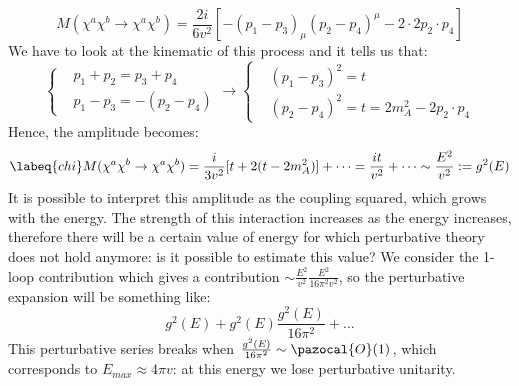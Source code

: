 \documentclass[../main.tex]{subfiles}
\begin{document}
\[
M(\chi^a\chi^b\to\chi^a\chi^b)=\frac{2i}{6v^2}[-(p_1-p_3)_\mu(p_2-p_4)^\mu-2\cdot2p_2\cdot p_4]
\]
We have to look at the kinematic of this process and it tells us that:
\[
\left\{
\begin{aligned}
&p_1+p_2=p_3+p_4\\
&p_1-p_3=-(p_2-p_4)
\end{aligned}
\right.
\to
\left\{
\begin{aligned}
&(p_1-p_3)^2=t\\
&(p_2-p_4)^2=t=2m_A^2-2p_2\cdot p_4
\end{aligned}
\right.
\]
Hence, the amplitude becomes:
\begin{equation}
\labeq{chi}
M(\chi^a\chi^b\to\chi^a\chi^b)=\frac{i}{3v^2}[t+2(t-2m_A^2)]+\dots=\frac{it}{v^2}+\dots\sim\frac{E^2}{v^2}:=g^2(E)
\end{equation}
It is possible to interpret this amplitude as the coupling squared, which grows with the energy. The strength of this interaction increases as the energy increases, therefore there will be a certain value of energy for which perturbative theory does not hold anymore: is it possible to estimate this value? We consider the 1-loop contribution  which gives a contribution $\sim\frac{E^2}{v^2}\frac{E^2}{16\pi^2v^2}$, so the perturbative expansion will be something like:
\[
g^2(E)+g^2(E)\frac{g^2(E)}{16\pi^2}+\dots
\]
This perturbative series breaks when $\frac{g^2(E)}{16\pi^2}\sim\pazocal{O}(1)$, which corresponds to $E_{max}\approx4\pi v$: at this energy we lose perturbative unitarity. 
\end{document}

